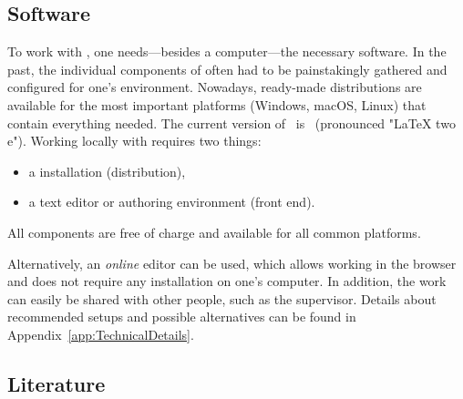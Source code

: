 \subsection{Software}
\label{sec:Software}

To work with \latex, one needs---besides a computer---the necessary software. In
the past, the individual components of \latex often had to be painstakingly
gathered and configured for one's environment. Nowadays, ready-made
distributions are available for the most important platforms (Windows, macOS,
Linux) that contain everything needed. The current version of \latex\ is
\LaTeXe\ (pronounced "LaTeX two e"). Working locally with \latex requires two
things:
%
\begin{itemize}
    \item a \latex installation (distribution),
    \item a text editor or authoring environment (front end).
\end{itemize}
%
All components are free of charge and available for all common platforms.

Alternatively, an \emph{online} editor can be used, which allows working in the browser
and does not require any installation on one's computer. In addition, the work
can easily be shared with other people, such as the supervisor. Details about
recommended setups and possible alternatives can be found in
Appendix~\ref{app:TechnicalDetails}.

\subsection{Literature}
\label{sec:literature}

